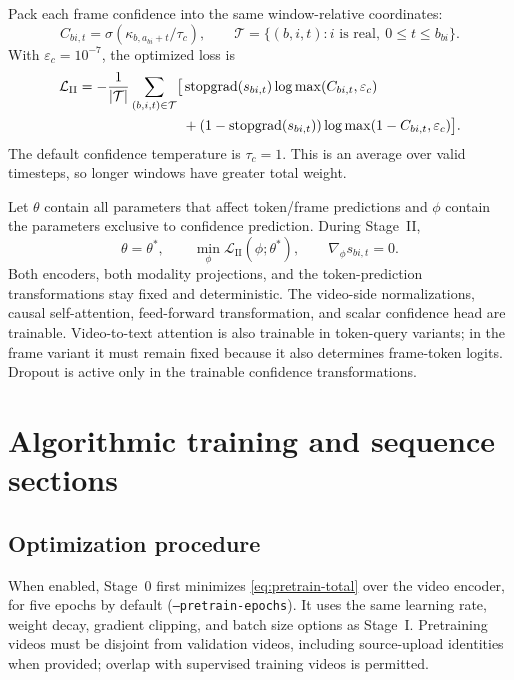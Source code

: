 \documentclass[11pt,a4paper]{article}
\newcommand{\sg}{\operatorname{stopgrad}}
\newcommand{\eps}{\varepsilon}
\numberwithin{equation}{section}
\begin{document}
Pack each frame confidence into the same window-relative coordinates:
\begin{equation}
C_{bi,t}=\sigma(\kappa_{b,a_{bi}+t}/\tau_c),\qquad
\mathcal T=\{(b,i,t):i\text{ is real},\ 0\leq t\leq b_{bi}\}.
\end{equation}
With $\eps_c=10^{-7}$, the optimized loss is
\begin{align}
\mathcal L_{\mathrm{II}}
=-\frac1{|\mathcal T|}\sum_{(b,i,t)\in\mathcal T}
\bigl[&\sg(s_{bi,t})\log\max(C_{bi,t},\eps_c)\notag\\
 &+(1-\sg(s_{bi,t}))\log\max(1-C_{bi,t},\eps_c)\bigr].
\label{eq:confidence-loss}
\end{align}
The default confidence temperature is $\tau_c=1$. This is an average
over valid timesteps, so longer windows have greater total weight.

Let $\theta$ contain all parameters that affect token/frame predictions
and $\phi$ contain the parameters exclusive to confidence prediction.
During Stage~II,
\begin{equation}
\theta=\theta^*,\qquad
\min_{\phi}\mathcal L_{\mathrm{II}}(\phi;\theta^*),\qquad
\nabla_\phi s_{bi,t}=0.
\end{equation}
Both encoders, both modality projections, and the token-prediction
transformations stay fixed and deterministic. The video-side
normalizations, causal self-attention, feed-forward transformation,
and scalar confidence head are trainable. Video-to-text attention is
also trainable in token-query variants; in the frame variant it must
remain fixed because it also determines frame-token logits. Dropout
is active only in the trainable confidence transformations.

\section{Algorithmic training and sequence sections}

\subsection{Optimization procedure}

When enabled, Stage~0 first minimizes \eqref{eq:pretrain-total} over
the video encoder, for five epochs by default
(\texttt{--pretrain-epochs}). It uses the same learning rate,
weight decay, gradient clipping, and batch size options as Stage~I.
Pretraining videos must be disjoint from validation videos, including
source-upload identities when provided; overlap with supervised
training videos is permitted.
\end{document}
